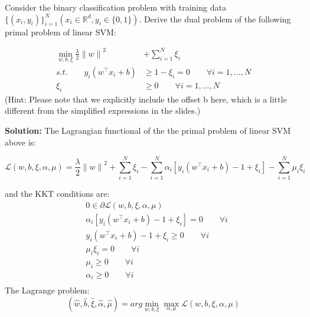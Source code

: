\documentclass[a4paper]{article}
\begin{document}
Consider the binary classification problem with training data $\{(x_i , y_i )\}^{N}_{i=1} (x_i \in \mathbb{R}^d , y_i \in \{0, 1\})$. Derive the dual problem of the following primal problem of linear SVM:

\begin{equation}
    \begin{aligned}
        \min_{w, b, \xi}    \frac{\lambda}{2}{\|w\|}^2 &+ \sum_{i=1}^{N} \xi_i \\
        s.t.\qquad  y_i(w^{\top} x_i + b) &\ge 1- \xi_i =0 \qquad \forall i =1,...,N\\
        \xi_i &\ge 0 \qquad \forall i =1,...,N
    \end{aligned}
\end{equation}
(Hint: Please note that we explicitly include the offset b here, which is a little
different from the simplified expressions in the slides.)

\textbf{Solution:} The Lagrangian functional of the the primal problem  of linear SVM above is:

\begin{equation}
   \mathcal{L}(w,b,\xi,\alpha, \mu) =  \frac{\lambda}{2}{\|w\|}^2 + \sum_{i=1}^{N} \xi_i - \sum_{i=1}^{N} \alpha_i [y_i(w^{\top} x_i + b) - 1+\xi_i] - \sum_{i=1}^{N} \mu_i \xi_i 
\end{equation}

and the KKT conditions are:
\begin{equation}
    \begin{aligned}
        & 0 \in \partial \mathcal{L}(w,b,\xi,\alpha,\mu) \\
        &\alpha_i [y_i(w^{\top} x_i + b) - 1+\xi_i] =0 \qquad \forall i \\
        & y_i(w^{\top} x_i + b) - 1+\xi_i \ge 0 \qquad \forall i\\
        & \mu_i \xi_i = 0 \qquad \forall i\\
        & \mu_i \ge 0 \qquad \forall i\\
        & \alpha_i \ge 0 \qquad \forall i\\
    \end{aligned}
\end{equation}
The Lagrange problem:
\begin{equation}
   (\hat{w}, \hat{b},\hat{\xi},\hat{\alpha},\hat{\mu}) = arg \min_{w,b,\xi} \max_{\alpha,\mu}\mathcal{L}(w,b,\xi,\alpha,\mu) 
\end{equation}
\end{document}
